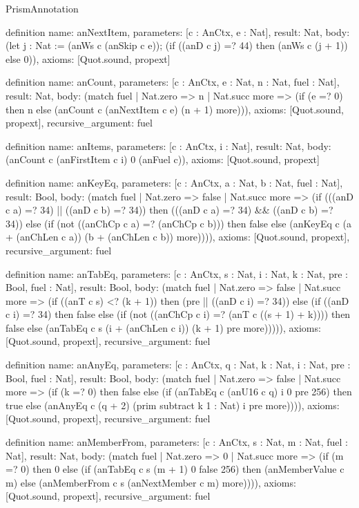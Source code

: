 \begin{lexlean}{PrismAnnotation}
\begin{semanticmodule}
definition{
  name: anNextItem,
  parameters: [c : AnCtx, e : Nat],
  result: Nat,
  body: (let j : Nat := (anWs c (anSkip c e)); (if ((anD c j) =? 44) then (anWs c (j + 1)) else 0)),
  axioms: [Quot.sound, propext]
}

definition{
  name: anCount,
  parameters: [c : AnCtx, e : Nat, n : Nat, fuel : Nat],
  result: Nat,
  body: (match fuel
    | Nat.zero => n
    | Nat.succ more => (if (e =? 0) then n else (anCount c (anNextItem c e) (n + 1) more))),
  axioms: [Quot.sound, propext],
  recursive_argument: fuel
}

definition{
  name: anItems,
  parameters: [c : AnCtx, i : Nat],
  result: Nat,
  body: (anCount c (anFirstItem c i) 0 (anFuel c)),
  axioms: [Quot.sound, propext]
}

definition{
  name: anKeyEq,
  parameters: [c : AnCtx, a : Nat, b : Nat, fuel : Nat],
  result: Bool,
  body: (match fuel
    | Nat.zero => false
    | Nat.succ more => (if (((anD c a) =? 34) || ((anD c b) =? 34)) then (((anD c a) =? 34) && ((anD c b) =? 34)) else (if (not ((anChCp c a) =? (anChCp c b))) then false else (anKeyEq c (a + (anChLen c a)) (b + (anChLen c b)) more)))),
  axioms: [Quot.sound, propext],
  recursive_argument: fuel
}

definition{
  name: anTabEq,
  parameters: [c : AnCtx, s : Nat, i : Nat, k : Nat, pre : Bool, fuel : Nat],
  result: Bool,
  body: (match fuel
    | Nat.zero => false
    | Nat.succ more => (if ((anT c s) <? (k + 1)) then (pre || ((anD c i) =? 34)) else (if ((anD c i) =? 34) then false else (if (not ((anChCp c i) =? (anT c ((s + 1) + k)))) then false else (anTabEq c s (i + (anChLen c i)) (k + 1) pre more))))),
  axioms: [Quot.sound, propext],
  recursive_argument: fuel
}

definition{
  name: anAnyEq,
  parameters: [c : AnCtx, q : Nat, k : Nat, i : Nat, pre : Bool, fuel : Nat],
  result: Bool,
  body: (match fuel
    | Nat.zero => false
    | Nat.succ more => (if (k =? 0) then false else (if (anTabEq c (anU16 c q) i 0 pre 256) then true else (anAnyEq c (q + 2) (prim subtract k 1 : Nat) i pre more)))),
  axioms: [Quot.sound, propext],
  recursive_argument: fuel
}

definition{
  name: anMemberFrom,
  parameters: [c : AnCtx, s : Nat, m : Nat, fuel : Nat],
  result: Nat,
  body: (match fuel
    | Nat.zero => 0
    | Nat.succ more => (if (m =? 0) then 0 else (if (anTabEq c s (m + 1) 0 false 256) then (anMemberValue c m) else (anMemberFrom c s (anNextMember c m) more)))),
  axioms: [Quot.sound, propext],
  recursive_argument: fuel
}


\end{semanticmodule}
\end{lexlean}

